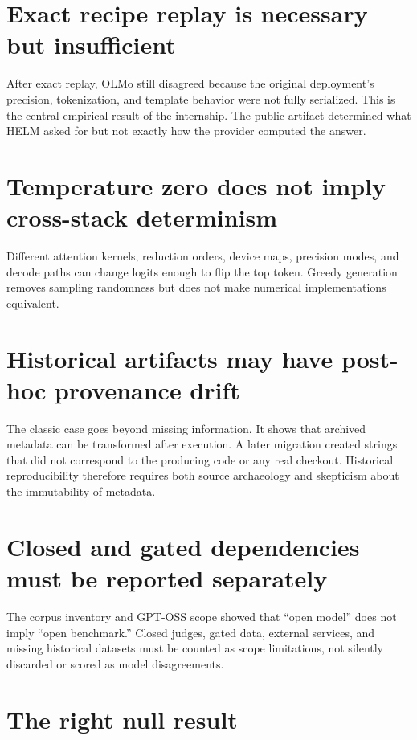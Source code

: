 \documentclass[11pt,oneside]{report}
\newcommand{\code}[1]{\texttt{\detokenize{#1}}}
\begin{document}
\section{Exact recipe replay is necessary but insufficient}

After exact replay, OLMo still disagreed because the original deployment's precision, tokenization, and template behavior were not fully serialized. This is the central empirical result of the internship. The public artifact determined what HELM asked for but not exactly how the provider computed the answer.

\section{Temperature zero does not imply cross-stack determinism}

Different attention kernels, reduction orders, device maps, precision modes, and decode paths can change logits enough to flip the top token. Greedy generation removes sampling randomness but does not make numerical implementations equivalent.

\section{Historical artifacts may have post-hoc provenance drift}

The classic \code{class_name} case goes beyond missing information. It shows that archived metadata can be transformed after execution. A later migration created strings that did not correspond to the producing code or any real checkout. Historical reproducibility therefore requires both source archaeology and skepticism about the immutability of metadata.

\section{Closed and gated dependencies must be reported separately}

The corpus inventory and GPT-OSS scope showed that ``open model'' does not imply ``open benchmark.'' Closed judges, gated data, external services, and missing historical datasets must be counted as scope limitations, not silently discarded or scored as model disagreements.

\section{The right null result}
\end{document}
